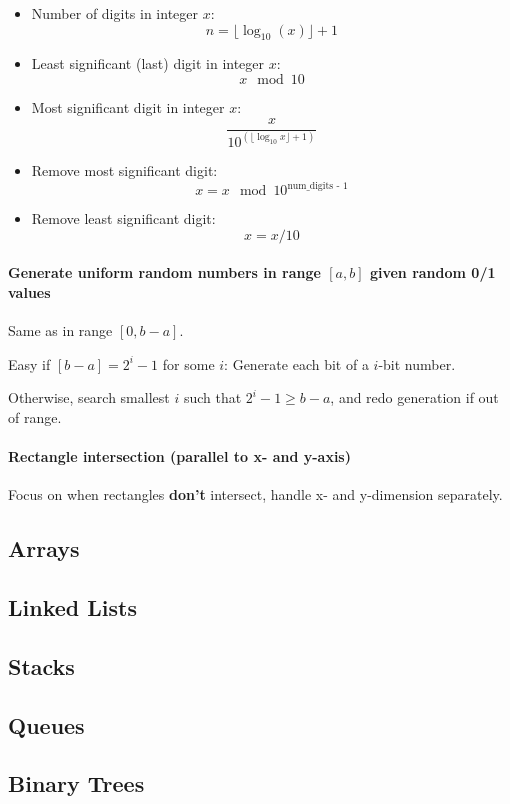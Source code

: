 \documentclass[runningheads]{llncs}
\begin{document}
\begin{itemize}
	\item Number of digits in integer $x$:
$$n = \lfloor \log_10(x) \rfloor + 1$$

	\item Least significant (last) digit in integer $x$:
$$x \mod 10$$

	\item Most significant digit in integer $x$:
$$\frac{x}{10^{(\lfloor \log_10 x \rfloor + 1)}}$$

	\item Remove most significant digit:
$$x = x \mod 10^{\text{num\_digits - 1}}$$

	\item Remove least significant digit:
$$x = x / 10$$
\end{itemize}

\paragraph{Generate uniform random numbers in range $[a,b]$ given random 0/1 values}
Same as in range $[0, b-a]$.

Easy if $[b-a] = 2^i - 1$ for some $i$: Generate each bit of a $i$-bit number.

Otherwise, search smallest $i$ such that $2^i - 1 \geq b - a$, and redo generation if out of range.


\paragraph{Rectangle intersection (parallel to x- and y-axis)}
Focus on when rectangles \textbf{don't} intersect, handle x- and y-dimension separately.

\subsection{Arrays}
\subsection{Linked Lists}
\subsection{Stacks}
\subsection{Queues}
\subsection{Binary Trees}
\end{document}
